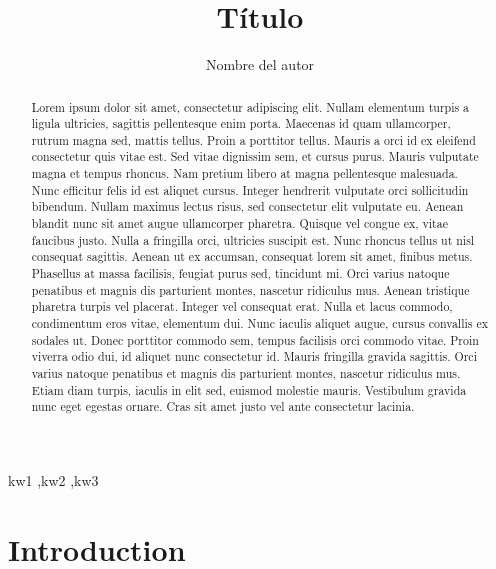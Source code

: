 \documentclass[final,5p,times,twocolumn]{elsarticle}
\def\corref#1{}%
\begin{document}
\begin{frontmatter}

\title{T\'itulo}

\author[uv]{Nombre del autor\corref{cor}}

\address[uv]{Escuela de Ingenier\'ia Inform\'atica, Universidad de Valpara\'iso, Valpara\'iso, Chile.}

\begin{abstract}
Lorem ipsum dolor sit amet, consectetur adipiscing elit. Nullam elementum turpis a ligula ultricies, sagittis pellentesque enim porta. Maecenas id quam ullamcorper, rutrum magna sed, mattis tellus. Proin a porttitor tellus. Mauris a orci id ex eleifend consectetur quis vitae est. Sed vitae dignissim sem, et cursus purus. Mauris vulputate magna et tempus rhoncus. Nam pretium libero at magna pellentesque malesuada. Nunc efficitur felis id est aliquet cursus. Integer hendrerit vulputate orci sollicitudin bibendum. Nullam maximus lectus risus, sed consectetur elit vulputate eu. Aenean blandit nunc sit amet augue ullamcorper pharetra. Quisque vel congue ex, vitae faucibus justo. Nulla a fringilla orci, ultricies suscipit est. Nunc rhoncus tellus ut nisl consequat sagittis. Aenean ut ex accumsan, consequat lorem sit amet, finibus metus. Phasellus at massa facilisis, feugiat purus sed, tincidunt mi. Orci varius natoque penatibus et magnis dis parturient montes, nascetur ridiculus mus. Aenean tristique pharetra turpis vel placerat. Integer vel consequat erat. Nulla et lacus commodo, condimentum eros vitae, elementum dui. Nunc iaculis aliquet augue, cursus convallis ex sodales ut. Donec porttitor commodo sem, tempus facilisis orci commodo vitae. Proin viverra odio dui, id aliquet nunc consectetur id. Mauris fringilla gravida sagittis. Orci varius natoque penatibus et magnis dis parturient montes, nascetur ridiculus mus. Etiam diam turpis, iaculis in elit sed, euismod molestie mauris. Vestibulum gravida nunc eget egestas ornare. Cras sit amet justo vel ante consectetur lacinia.
\end{abstract}

\begin{keyword}
kw1 \sep kw2 \sep kw3 
\end{keyword}

\end{frontmatter}

\section{Introduction}
\label{sec:in}
\end{document}
